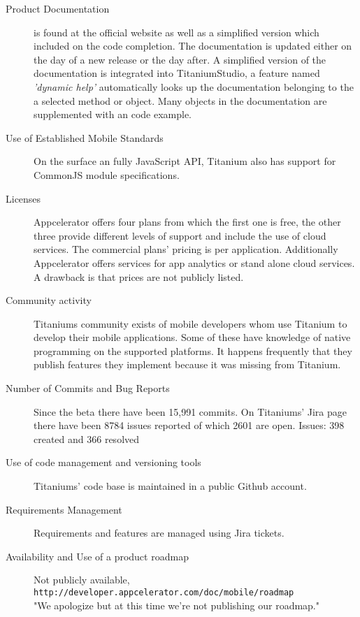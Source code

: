 \begin{description}
\item [Product Documentation] is found at the official website as well as a simplified version which included on the code completion.
The documentation is updated either on the day of a new release or the day after.\cite{Inc2012b} A simplified version of the documentation is integrated into TitaniumStudio, a feature named \emph{'dynamic help'} automatically looks up the documentation belonging to the a selected method or object.
Many objects in the documentation are supplemented with an code example.
\item [Use of Established Mobile Standards] 
On the surface an fully JavaScript API, Titanium also has support for CommonJS module specifications. 
\item [Licenses] Appcelerator offers four plans from which the first one is free, the other three provide different levels of support and include the use of cloud services. The commercial plans' pricing is per application. Additionally Appcelerator offers services for app analytics or stand alone cloud services. A drawback is that prices are not publicly listed.
\item [Community activity] Titaniums community exists of mobile developers whom use Titanium to develop their mobile applications. Some of these have knowledge of native programming on the supported platforms. It happens frequently that they publish features they implement because it was missing from Titanium. 
\item [Number of Commits and Bug Reports] Since the beta there have been 15,991 commits. %
On Titaniums' Jira page there have been 8784 issues reported of which 2601 are open.
Issues: 398 created and 366 resolved
\item [Use of code management and versioning tools] Titaniums' code base is maintained in a public Github account.%
\item [Requirements Management] Requirements and features are managed using Jira tickets.
\item [Availability and Use of a product roadmap] Not publicly available,\\
\texttt{http://developer.appcelerator.com/doc/mobile/roadmap}\\
"We apologize but at this time we're not publishing our roadmap."
\end{description}